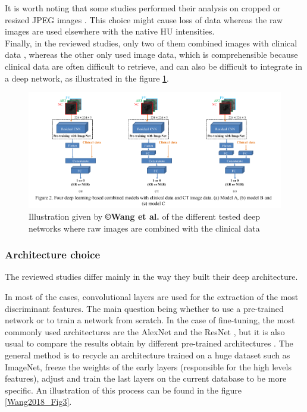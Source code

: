 It is worth noting that some studies performed their analysis on cropped or
resized JPEG images \cite{Yasaka2018,Yasaka2018a,WANG2019}. 
This choice might cause loss of data whereas the raw images are used elsewhere with the native HU intensities.\\
Finally, in the reviewed studies, only two of them combined images with
clinical data \cite{Yasaka2018a,WANG2019}, whereas the other only used image data, which is
comprehensible because clinical data are often difficult to retrieve,
and can also be difficult to integrate in a deep network, as illustrated
in the figure \ref{Wang2019_Fig2}.
\begin{figure}[th!]
\centering
\includegraphics[width=0.7\linewidth]{images/image5}
\caption{Illustration given by \textbf{©Wang et al.} of the different tested deep networks where raw images are combined with the clinical data \cite{WANG2019}}
\label{Wang2019_Fig2}
\end{figure}


\subsubsection{Architecture choice}\label{architecure-choice}



The reviewed studies differ mainly in the way they built their deep
architecture.

In most of the cases, convolutional layers are used for the extraction
of the most discriminant features. The main question being whether to
use a pre-trained network or to train a network from scratch. In the
case of fine-tuning, the most commonly used architectures are the
AlexNet and the ResNet \cite{WANG2019,Wang2018,Yamada2019,Peng2020}, but it is also usual to
compare the results obtain by different pre-trained architectures \cite{WANG2019,Yamada2019}. The general method
is to recycle an architecture trained on a huge dataset such as
ImageNet, freeze the weights of the early layers (responsible for the
high levels features), adjust and train the last layers on the current
database to be more specific.
An illustration of this process can be found in the figure \ref{Wang2018_Fig3}.

